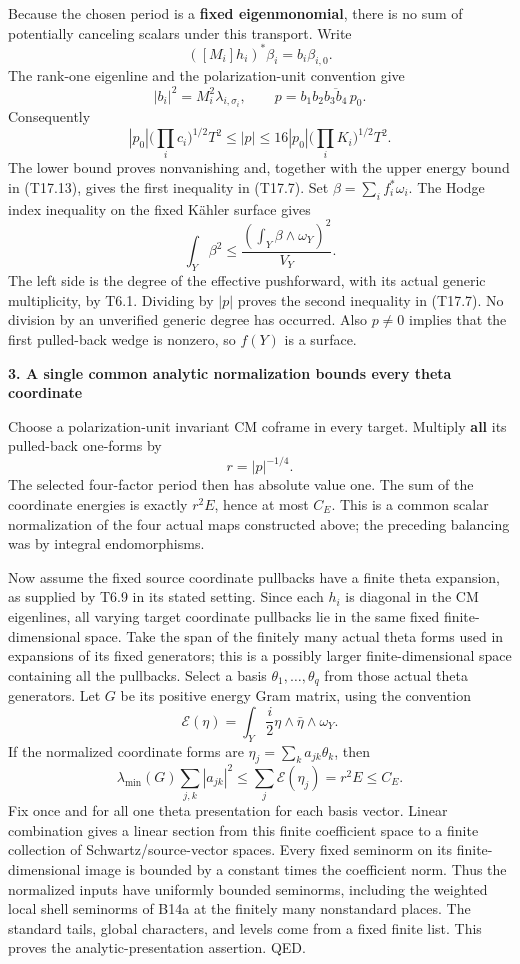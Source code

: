 \documentclass[11pt,a4paper]{article}
\theoremstyle{definition}
\begin{document}
Because the chosen period is a \textbf{fixed eigenmonomial}, there is no sum of potentially canceling scalars under this transport. Write \[
([M_i]h_i)^*\beta_i=b_i\beta_{i,0}.
\] The rank-one eigenline and the polarization-unit convention give \[
|b_i|^2=M_i^2\lambda_{i,\sigma_i},\qquad
p=b_1b_2\overline{b_3b_4}\,p_0.
\tag{T17.14}
\] Consequently \[
|p_0|\bigl(\prod_i c_i\bigr)^{1/2}T^2
\le |p|
\le16|p_0|\bigl(\prod_iK_i\bigr)^{1/2}T^2.
\tag{T17.15}
\] The lower bound proves nonvanishing and, together with the upper energy bound in (T17.13), gives the first inequality in (T17.7). Set \(\beta=\sum_i f_i^*\omega_i\). The Hodge index inequality on the fixed Kähler surface gives \[
\int_Y\beta^2\le\frac{(\int_Y\beta\wedge\omega_Y)^2}{V_Y}.
\] The left side is the degree of the effective pushforward, with its actual generic multiplicity, by T6.1. Dividing by \(|p|\) proves the second inequality in (T17.7). No division by an unverified generic degree has occurred. Also \(p\ne0\) implies that the first pulled-back wedge is nonzero, so \(f(Y)\) is a surface.

\textbf{3. A single common analytic normalization bounds every theta coordinate}

Choose a polarization-unit invariant CM coframe in every target. Multiply \textbf{all} its pulled-back one-forms by \[
r=|p|^{-1/4}.
\] The selected four-factor period then has absolute value one. The sum of the coordinate energies is exactly \(r^2E\), hence at most \(C_E\). This is a common scalar normalization of the four actual maps constructed above; the preceding balancing was by integral endomorphisms.

Now assume the fixed source coordinate pullbacks have a finite theta expansion, as supplied by T6.9 in its stated setting. Since each \(h_i\) is diagonal in the CM eigenlines, all varying target coordinate pullbacks lie in the same fixed finite-dimensional space. Take the span of the finitely many actual theta forms used in expansions of its fixed generators; this is a possibly larger finite-dimensional space containing all the pullbacks. Select a basis \(\theta_1,\ldots,\theta_q\) from those actual theta generators. Let \(G\) be its positive energy Gram matrix, using the convention \[
\mathcal E(\eta)=\int_Y\frac i2\eta\wedge\bar\eta\wedge\omega_Y.
\] If the normalized coordinate forms are \(\eta_j=\sum_k a_{jk}\theta_k\), then \[
\lambda_{\min}(G)\sum_{j,k}|a_{jk}|^2
\le\sum_j\mathcal E(\eta_j)
=r^2E\le C_E.
\tag{T17.16}
\] Fix once and for all one theta presentation for each basis vector. Linear combination gives a linear section from this finite coefficient space to a finite collection of Schwartz/source-vector spaces. Every fixed seminorm on its finite-dimensional image is bounded by a constant times the coefficient norm. Thus the normalized inputs have uniformly bounded seminorms, including the weighted local shell seminorms of B14a at the finitely many nonstandard places. The standard tails, global characters, and levels come from a fixed finite list. This proves the analytic-presentation assertion. QED.
\end{document}
